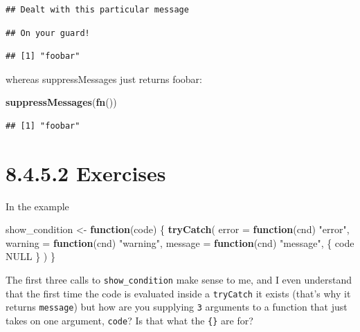 \documentclass[]{book}
\newenvironment{Shaded}{\begin{snugshade}}{\end{snugshade}}
\newcommand{\ControlFlowTok}[1]{\textcolor[rgb]{0.13,0.29,0.53}{\textbf{#1}}}
\newcommand{\DataTypeTok}[1]{\textcolor[rgb]{0.13,0.29,0.53}{#1}}
\newcommand{\KeywordTok}[1]{\textcolor[rgb]{0.13,0.29,0.53}{\textbf{#1}}}
\newcommand{\NormalTok}[1]{#1}
\newcommand{\OtherTok}[1]{\textcolor[rgb]{0.56,0.35,0.01}{#1}}
\newcommand{\StringTok}[1]{\textcolor[rgb]{0.31,0.60,0.02}{#1}}
\begin{document}
\begin{verbatim}
## Dealt with this particular message
\end{verbatim}

\begin{verbatim}
## On your guard!
\end{verbatim}

\begin{verbatim}
## [1] "foobar"
\end{verbatim}

whereas suppressMessages just returns foobar:

\begin{Shaded}
\begin{Highlighting}[]
\KeywordTok{suppressMessages}\NormalTok{(}\KeywordTok{fn}\NormalTok{())}
\end{Highlighting}
\end{Shaded}

\begin{verbatim}
## [1] "foobar"
\end{verbatim}

\hypertarget{exercises-4}{%
\section*{8.4.5.2 Exercises}\label{exercises-4}}

In the example

\begin{Shaded}
\begin{Highlighting}[]
\NormalTok{show_condition <-}\StringTok{ }\ControlFlowTok{function}\NormalTok{(code) \{}
  \KeywordTok{tryCatch}\NormalTok{(}
    \DataTypeTok{error =} \ControlFlowTok{function}\NormalTok{(cnd) }\StringTok{"error"}\NormalTok{,}
    \DataTypeTok{warning =} \ControlFlowTok{function}\NormalTok{(cnd) }\StringTok{"warning"}\NormalTok{,}
    \DataTypeTok{message =} \ControlFlowTok{function}\NormalTok{(cnd) }\StringTok{"message"}\NormalTok{,}
\NormalTok{    \{}
\NormalTok{      code}
      \OtherTok{NULL}
\NormalTok{    \}}
\NormalTok{  )}
\NormalTok{\}}
\end{Highlighting}
\end{Shaded}

The first three calls to \texttt{show\_condition} make sense to me, and I even understand that the first time the code is evaluated inside a \texttt{tryCatch} it exists (that's why it returns \texttt{message}) but how are you supplying \texttt{3} arguments to a function that just takes on one argument, \texttt{code}? Is that what the \texttt{\{\}} are for?
\end{document}
